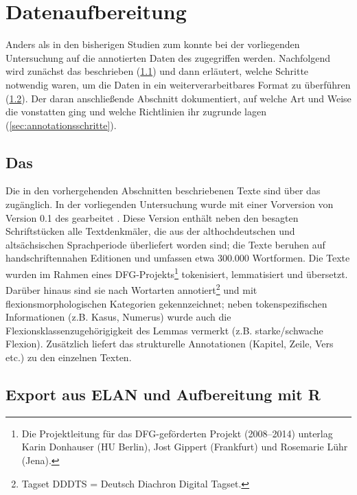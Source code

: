 \section{Datenaufbereitung} \label{sec:datenaufbereitung}

Anders als in den bisherigen Studien zum  konnte bei der vorliegenden Untersuchung auf die annotierten Daten des   zugegriffen werden. Nachfolgend wird zunächst das  beschrieben (\ref{sec:ddd}) und dann erläutert, welche Schritte notwendig waren, um die Daten in ein weiterverarbeitbares Format zu überführen (\ref{sec:aufbereitung}). Der daran anschließende Abschnitt dokumentiert, auf welche Art und Weise die  vonstatten ging und welche Richtlinien  ihr zugrunde lagen (\ref{sec:annotationsschritte}).

\subsection{Das } \label{sec:ddd}

Die in den vorhergehenden Abschnitten beschriebenen Texte sind über das   \parencite{Donhauser2015} zugänglich. In der vorliegenden Untersuchung wurde mit einer Vorversion von Version 0.1 des  gearbeitet \parencite{Donhauser2014}. Diese Version enthält neben den besagten Schriftstücken alle Textdenkmäler, die aus der althochdeutschen und altsächsischen Sprachperiode überliefert worden sind; die Texte beruhen auf handschriftennahen Editionen und umfassen etwa 300.000 Wortformen.
Die Texte wurden im Rahmen eines DFG-Projekts\footnote{Die Projektleitung für das DFG-geförderten Projekt (2008--2014) unterlag Karin Donhauser (HU Berlin), Jost Gippert (Frankfurt) und Rosemarie Lühr (Jena).}  tokenisiert,  lemmatisiert und übersetzt. Darüber hinaus sind sie nach Wortarten  annotiert\footnote{Tagset DDDTS = Deutsch Diachron Digital Tagset.} und mit flexionsmorphologischen Kategorien gekennzeichnet; neben  tokenspezifischen Informationen (z.B. Kasus, Numerus) wurde auch die Flexionsklassenzugehörigigkeit des Lemmas  vermerkt (z.B. starke/schwache Flexion). Zusätzlich liefert das  strukturelle Annotationen  (Kapitel, Zeile, Vers etc.) zu den einzelnen Texten. 


\subsection{Export aus ELAN und Aufbereitung mit R}\label{sec:aufbereitung}

